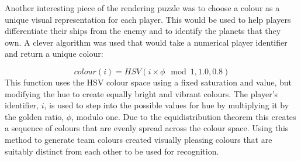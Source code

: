 Another interesting piece of the rendering puzzle was to choose a colour as a unique visual representation for each player. This would be used to help players differentiate their ships from the enemy and to identify the planets that they own. A clever algorithm was used that would take a numerical player identifier and return a unique colour:\cite{ankerl2009}

\begin{equation*}
	colour(i) = HSV(i \times \phi \mod 1, 1.0, 0.8)
\end{equation*}
\noindent
This function uses the HSV colour space using a fixed saturation and value, but modifying the hue to create equally bright and vibrant colours. The player's identifier, $i$, is used to step into the possible values for hue by multiplying it by the golden ratio, $\phi$, modulo one. Due to the equidistribution theorem this creates a sequence of colours that are evenly spread across the colour space. Using this method to generate team colours created visually pleasing colours that are suitably distinct from each other to be used for recognition.
